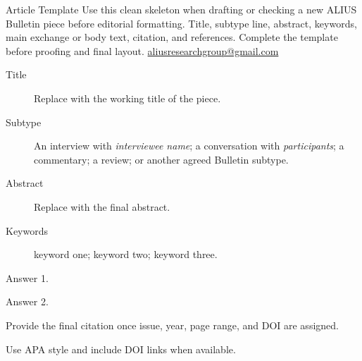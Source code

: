 \documentclass[11pt]{article}
\begin{document}
\guideHeader
  {Article Template}
  {Use this clean skeleton when drafting or checking a new ALIUS Bulletin piece before editorial formatting.}
  {Title, subtype line, abstract, keywords, main exchange or body text, citation, and references.}
  {Complete the template before proofing and final layout.}
  {\href{mailto:aliusresearchgroup@gmail.com}{aliusresearchgroup@gmail.com}}


\begin{description}
\item[Title] Replace with the working title of the piece.
\item[Subtype] An interview with \emph{interviewee name}; a conversation with \emph{participants}; a commentary; a review; or another agreed Bulletin subtype.
\item[Abstract] Replace with the final abstract.
\item[Keywords] keyword one; keyword two; keyword three.
\end{description}



Answer 1.


Answer 2.


Provide the final citation once issue, year, page range, and DOI are assigned.


Use APA style and include DOI links when available.
\end{document}
